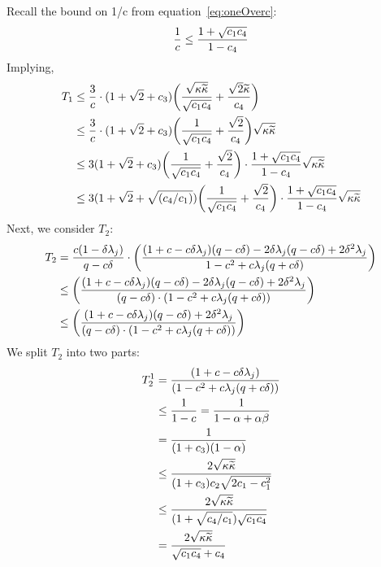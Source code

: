 \iffalse
We will now consider bounding $\frac{1}{c}$:
\begin{align*}
\frac{1}{c}&=\frac{1}{\alpha(1-\beta)}\\
&=1+\frac{(1+\cthree)\ctwo\sqrt{2\cone-\cone^2}}{\sqrt{\cnH\cnS}-\ctwo\cthree\sqrt{2\cone-\cone^2}}\\
&\leq1+\frac{(1+\cthree)\ctwo\sqrt{2\cone-\cone^2}}{1-\ctwo\cthree\sqrt{2\cone-\cone^2}}\\
&=1+\frac{\sqrt{\cone\cfour}+\cfour}{1-\cfour}\\
&=\frac{1+\sqrt{\cone\cfour}}{1-\cfour}
\end{align*}
\fi
Recall the bound on 1/c from equation~\ref{eq:oneOverc}:
\begin{align*}
\frac{1}{c}\leq\frac{1+\sqrt{c_1c_4}}{1-c_4}
\end{align*}
Implying,
\begin{align}
\label{eq:t1final}
T_1&\leq\frac{3}{c}\cdot(1+\sqrt{2}+c_3)\bigg(\frac{\sqrt{{\kappa}\widetilde{\kappa}}}{\sqrt{c_1c_4}}+\frac{\sqrt{2}\widetilde{\kappa}}{c_4}\bigg)\nonumber\\
&\leq\frac{3}{c}\cdot(1+\sqrt{2}+c_3)\bigg(\frac{1}{\sqrt{c_1c_4}}+\frac{\sqrt{2}}{c_4}\bigg)\sqrt{{\kappa}\widetilde{\kappa}}\nonumber\\
&\leq3(1+\sqrt{2}+c_3)\bigg(\frac{1}{\sqrt{c_1c_4}}+\frac{\sqrt{2}}{c_4}\bigg)\cdot\frac{1+\sqrt{c_1c_4}}{1-c_4}\sqrt{{\kappa}\widetilde{\kappa}}\nonumber\\
&\leq3(1+\sqrt{2}+\sqrt{(c_4/c_1)})\bigg(\frac{1}{\sqrt{c_1c_4}}+\frac{\sqrt{2}}{c_4}\bigg)\cdot\frac{1+\sqrt{c_1c_4}}{1-c_4}\sqrt{{\kappa}\widetilde{\kappa}}
\end{align}
Next, we consider $T_{2}$:
\begin{align*}
T_2&=\frac{c(1-\delta\lambda_j)}{q -c\delta}\cdot\bigg(\frac{(1+c-c\delta\lambda_j)(q -c\delta)-2\delta\lambda_j(q -c\delta)+2\delta^2\lambda_j}{1-c^2+c\lambda_j(q +c\delta)}\bigg)\\
&\leq\bigg(\frac{(1+c-c\delta\lambda_j)(q -c\delta)-2\delta\lambda_j(q -c\delta)+2\delta^2\lambda_j}{(q -c\delta)\cdot(1-c^2+c\lambda_j(q +c\delta))}\bigg)\\
&\leq\bigg(\frac{(1+c-c\delta\lambda_j)(q -c\delta)+2\delta^2\lambda_j}{(q -c\delta)\cdot(1-c^2+c\lambda_j(q +c\delta))}\bigg)
\end{align*}
We split $T_2$ into two parts:
\begin{align*}
T_2^{1}&=\frac{(1+c-c\delta\lambda_j)}{(1-c^2+c\lambda_j(q +c\delta))}\\
&\leq\frac{1}{1-c}=\frac{1}{1-\alpha+\alpha\beta}\\
&=\frac{1}{(1+c_3)(1-\alpha)}\\
&\leq\frac{2\sqrt{{\kappa}\widetilde{\kappa}}}{(1+c_3)c_2\sqrt{2c_1-c_1^2}}\\
&\leq\frac{2\sqrt{{\kappa}\widetilde{\kappa}}}{(1+\sqrt{c_4/c_1})\sqrt{c_1c_4}}\\
&=\frac{2\sqrt{{\kappa}\widetilde{\kappa}}}{\sqrt{c_1c_4}+c_4}
\end{align*}
